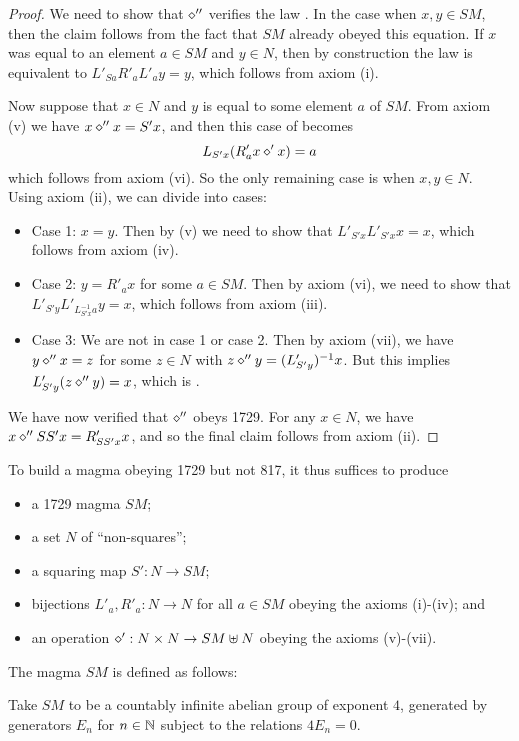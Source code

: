\begin{proof}  We need to show that $\diamond''$ verifies the law .  In the case when $x,y \in SM$, then the claim follows from the fact that $SM$ already obeyed this equation.  If $x$ was equal to an element $a \in SM$ and $y \in N$, then by construction the law is equivalent to $L'_{Sa} R'_a L'_a y = y$, which follows from axiom (i).

Now suppose that $x \in N$ and $y$ is equal to some element $a$ of $SM$.  From axiom (v) we have $x \diamond'' x = S'x$, and then this case of  becomes
$$L_{S'x} ( R'_a x \diamond' x ) = a$$
which follows from axiom (vi).  So the only remaining case is when $x,y \in N$.  Using axiom (ii), we can divide into cases:
\begin{itemize}
\item Case 1: $x=y$.  Then by (v) we need to show that $L'_{S'x} L'_{S'x} x = x$, which follows from axiom (iv).
\item Case 2: $y = R'_a x$ for some $a \in SM$.  Then by axiom (vi), we need to show that $L'_{S'y} L'_{L_{S'x}^{-1} a} y = x$, which follows from axiom (iii).
\item Case 3: We are not in case 1 or case 2.  Then by axiom (vii), we have $y \diamond'' x = z$ for some $z \in N$ with $z \diamond'' y = (L'_{S'y})^{-1} x$.  But this implies $L'_{S'y} (z \diamond'' y) = x$, which is .
\end{itemize}

We have now verified that $\diamond''$ obeys 1729.  For any $x \in N$, we have $x \diamond'' SS' x = R'_{SS' x} x$, and so the final claim follows from axiom (ii).
\end{proof}

To build a magma obeying 1729 but not 817, it thus suffices to produce
\begin{itemize}
  \item a 1729 magma $SM$;
  \item a set $N$ of ``non-squares'';
  \item a squaring map $S': N \to SM$;
  \item bijections $L'_a, R'_a: N \to N$ for all $a \in SM$ obeying the axioms (i)-(iv); and
  \item an operation $\diamond': N \times N \to SM \uplus N$ obeying the axioms (v)-(vii).
\end{itemize}

The magma $SM$ is defined as follows:

\begin{definition}[Definition of $SM$]\label{sm-def}\leanok Take $SM$ to be a countably infinite abelian group of exponent $4$, generated by generators $E_n$ for $n \in \mathbb{N}$ subject to the relations $4E_n=0$.
\end{definition}

